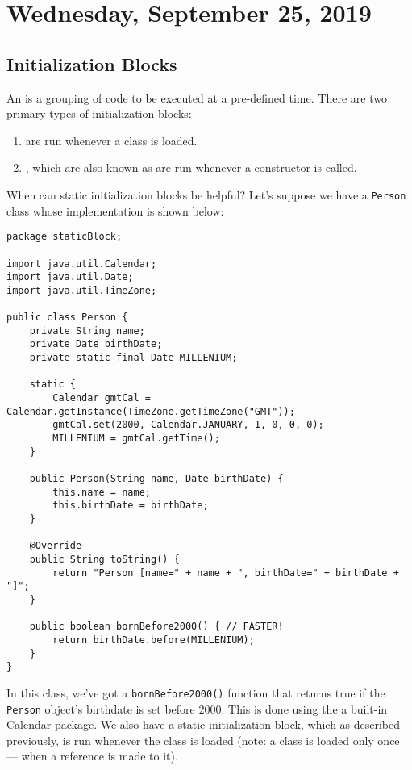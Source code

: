 \section{Wednesday, September 25, 2019}
\subsection{Initialization Blocks}
An  is a grouping of code to be executed at a pre-defined time.  There are two primary types of initialization blocks:
\begin{enumerate}
    \item {} are run whenever a class is loaded.
    \item {}, which are also known as  are run whenever a constructor is called.
\end{enumerate}


When can static initialization blocks be helpful? Let's suppose we have a \verb!Person! class whose implementation is shown below:

\begin{lstlisting}
package staticBlock;

import java.util.Calendar;
import java.util.Date;
import java.util.TimeZone;

public class Person {
	private String name;
	private Date birthDate;
	private static final Date MILLENIUM;
	
	static {
		Calendar gmtCal = Calendar.getInstance(TimeZone.getTimeZone("GMT"));
		gmtCal.set(2000, Calendar.JANUARY, 1, 0, 0, 0);
		MILLENIUM = gmtCal.getTime();
	}

	public Person(String name, Date birthDate) {
		this.name = name;
		this.birthDate = birthDate;
	}

	@Override
	public String toString() {
		return "Person [name=" + name + ", birthDate=" + birthDate + "]";
	}

	public boolean bornBefore2000() { // FASTER!
		return birthDate.before(MILLENIUM);
	}
}
\end{lstlisting}

In this class, we've got a \verb!bornBefore2000()! function that returns true if the \verb!Person! object's birthdate is set before $2000$. This is done using the a built-in Calendar package. We also have a static initialization block, which as described previously, is run whenever the class is loaded (note: a class is loaded only once --- when a reference is made to it). 

